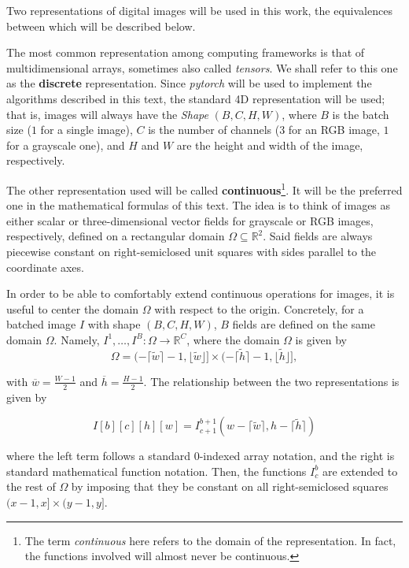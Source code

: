\documentclass[twocolumn,twoside,a4paper,10pt]{IEEEtran}
\begin{document}
Two representations of digital images will be used in this work, the equivalences between which will be described below.

The most common representation among computing frameworks is that of multidimensional arrays, sometimes also called \textit{tensors}. We shall refer to this one as the \textbf{discrete} representation. Since \textit{pytorch} will be used to implement the algorithms described in this text, the standard 4D representation will be used; that is, images will always have the \textit{Shape} \((B, C, H, W)\), where \(B\) is the batch size (\(1\) for a single image), \(C\) is the number of channels (\(3\) for an RGB image, \(1\) for a grayscale one), and \(H\) and \(W\) are the height and width of the image, respectively.

The other representation used will be called \textbf{continuous}\footnote{The term \textit{continuous} here refers to the domain of the representation. In fact, the functions involved will almost never be continuous.}. It will be the preferred one in the mathematical formulas of this text. The idea is to think of images as either scalar or three-dimensional vector fields for grayscale or RGB images, respectively, defined on a rectangular domain \(\Omega\subseteq \mathbb{R}^2\). Said fields are always piecewise constant on right-semiclosed unit squares with sides parallel to the coordinate axes.

In order to be able to comfortably extend continuous operations for images, it is useful to center the domain \(\Omega\) with respect to the origin. Concretely, for a batched image \(I\) with shape \((B, C, H, W)\), \(B\)  fields are defined on the same domain \(\Omega\). Namely, \(I^1, \dots, I^B\colon\Omega\to \mathbb{R}^C\), where the domain \(\Omega\) is given by
\[
  \Omega = (-\lceil \tilde{w}\rceil - 1, \lfloor \tilde{w}\rfloor]\times(-\lceil \tilde{h}\rceil -1, \lfloor \tilde{h}\rfloor]
,\]

with \(\overline{w}=\frac{W-1}{2}\) and \(\overline{h}=\frac{H-1}{2}\). The relationship between the two representations is given by

\begin{equation}\label{eq:discrete-continuous}
  I[b][c][h][w] = I^{b+1}_{c+1}(w - \lceil\tilde{w}\rceil, h - \lceil\tilde{h}\rceil)
\end{equation}

where the left term follows a standard \(0\)-indexed array notation, and the right is standard mathematical function notation. Then, the functions \(I^b_c\) are extended to the rest of \(\Omega\) by imposing that they be constant on all right-semiclosed squares \((x-1,x]\times(y-1, y]\).
\end{document}

